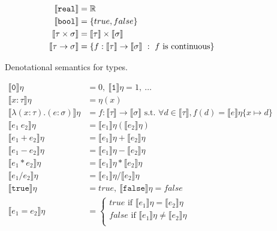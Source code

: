\begin{figure}
 \begin{align*}
\llbracket \texttt{real} \rrbracket &= \mathbb{R} \\
 \llbracket \texttt{bool} \rrbracket &= {\{true, false\}} \\
 \llbracket \tau \times \sigma \rrbracket &= \llbracket \tau \rrbracket \times \llbracket \sigma \rrbracket  \\
 \llbracket \tau \rightarrow \sigma \rrbracket &= \{f: \llbracket \tau \rrbracket \rightarrow \llbracket \sigma \rrbracket \ : 
 \ f \text{ is continuous}\} \\
 \end{align*}
 \caption{Denotational semantics for types.}
 \label{fig:densemtypes}
 \end{figure}
 \begin{figure}
\begin{align*}
 \llbracket \texttt{0} \rrbracket\eta &= 0, \  \llbracket \texttt{1} \rrbracket\eta = 1, \ \ldots \\
  \llbracket x : \tau \rrbracket\eta &= \eta(x) \\
  \llbracket \lambda (x : \tau) . (e : \sigma) \rrbracket\eta &= f : \llbracket \tau \rrbracket \rightarrow \llbracket \sigma \rrbracket
\text{ s.t. } \forall d \in \llbracket \tau \rrbracket, f(d) = \llbracket e \rrbracket\eta\{ x \mapsto d \} \\
 \llbracket e_1 \ e_2 \rrbracket \eta &= \llbracket e_1 \rrbracket\eta ( \llbracket e_2 \rrbracket\eta ) \\
 \llbracket e_1 + e_2 \rrbracket\eta &= \llbracket e_1 \rrbracket\eta + \llbracket e_2 \rrbracket\eta \\
 \llbracket e_1 - e_2 \rrbracket\eta &= \llbracket e_1 \rrbracket\eta - \llbracket e_2 \rrbracket\eta \\
 \llbracket e_1 * e_2 \rrbracket\eta &= \llbracket e_1 \rrbracket\eta * \llbracket e_2 \rrbracket\eta \\
  \llbracket e_1 / e_2 \rrbracket\eta &= \llbracket e_1 \rrbracket\eta / \llbracket e_2 \rrbracket\eta \\
  \llbracket \texttt{true} \rrbracket\eta &= true, \ \llbracket \texttt{false} \rrbracket\eta = false \\
 \llbracket e_1 = e_2 \rrbracket\eta &= 
 \begin{cases} 
      true \text{ if } \llbracket e_1 \rrbracket\eta = \llbracket e_2 \rrbracket\eta \\
      false \text{  if } \llbracket e_1 \rrbracket\eta \neq \llbracket e_2\rrbracket\eta \\

\end{cases}
\end{align*}
\end{figure}
